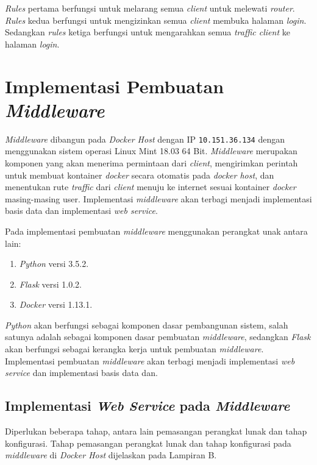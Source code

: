 \indent \textit{Rules} pertama berfungsi untuk melarang semua \textit{client} untuk melewati \textit{router}. \textit{Rules} kedua berfungsi untuk mengizinkan semua \textit{client} membuka halaman \textit{login}. Sedangkan \textit{rules} ketiga berfungsi untuk mengarahkan semua \textit{traffic client} ke halaman \textit{login}.

\section{Implementasi Pembuatan \textit{Middleware}}
\textit{Middleware} dibangun pada \textit{Docker Host} dengan IP \texttt{10.151.36.134} dengan menggunakan sistem operasi Linux Mint 18.03 64 Bit. \textit{Middleware} merupakan komponen yang akan menerima permintaan dari \textit{client}, mengirimkan perintah untuk membuat kontainer \textit{docker} secara otomatis pada \textit{docker host}, dan menentukan rute \textit{traffic} dari \textit{client} menuju ke internet sesuai kontainer \textit{docker} masing-masing user. Implementasi \textit{middleware} akan terbagi menjadi implementasi basis data dan implementasi \textit{web service}.

Pada implementasi pembuatan \textit{middleware} menggunakan perangkat unak antara lain:
\begin{enumerate}
	\item \textit{Python} versi 3.5.2.
	\item \textit{Flask} versi 1.0.2.
	\item \textit{Docker} versi 1.13.1.
\end{enumerate}

\textit{Python} akan berfungsi sebagai komponen dasar pembangunan sistem, salah satunya adalah sebagai komponen dasar pembuatan \textit{middleware}, sedangkan \textit{Flask} akan berfungsi sebagai kerangka kerja untuk pembuatan \textit{middleware}. Implementasi pembuatan \textit{middleware} akan terbagi menjadi implementasi \textit{web service} dan implementasi basis data dan.

\subsection{Implementasi \textit{Web Service} pada \textit{Middleware}}
Diperlukan beberapa tahap, antara lain pemasangan perangkat lunak dan tahap konfigurasi. Tahap pemasangan perangkat lunak dan tahap konfigurasi pada \textit{middleware} di \textit{Docker Host} dijelaskan pada Lampiran B.

